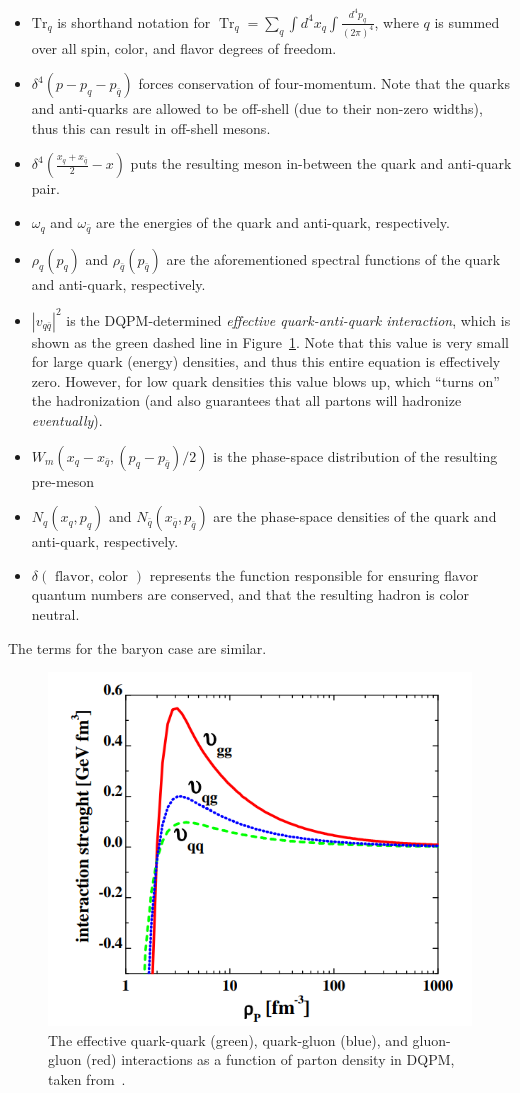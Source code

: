 \begin{itemize}
    \item $\text{Tr}_q$ is shorthand notation for $\operatorname{Tr}_q=\sum_q \int d^4 x_q \int \frac{d^4 p_q}{(2 \pi)^4}$, where $q$ is summed over all spin, color, and flavor degrees of freedom.
    \item $\delta^4(p-p_q-p_{\bar{q}})$ forces conservation of four-momentum. Note that the quarks and anti-quarks are allowed to be off-shell (due to their non-zero widths), thus this can result in off-shell mesons.
    \item $\delta^4\left(\frac{x_q+x_{\bar{q}}}{2}-x\right)$ puts the resulting meson in-between the quark and anti-quark pair.
    \item $\omega_q$ and $\omega_{\bar{q}}$ are the energies of the quark and anti-quark, respectively.
    \item $\rho_q\left(p_q\right)$ and $\rho_{\bar{q}}\left(p_{\bar{q}}\right)$ are the aforementioned spectral functions of the quark and anti-quark, respectively.
    \item $\left|v_{q \bar{q}}\right|^2$ is the DQPM-determined \textit{effective quark-anti-quark interaction}, which is shown as the green dashed line in Figure~\ref{fig:vqq}. Note that this value is very small for large quark (energy) densities, and thus this entire equation is effectively zero. However, for low quark densities this value blows up, which ``turns on'' the hadronization (and also guarantees that all partons will hadronize \textit{eventually}).
    \item $W_m\left(x_q-x_{\bar{q}},\left(p_q-p_{\bar{q}}\right) / 2\right)$ is the phase-space distribution of the resulting pre-meson
    \item $N_q\left(x_q, p_q\right)$ and $N_{\bar{q}}\left(x_{\bar{q}}, p_{\bar{q}}\right)$ are the phase-space densities of the quark and anti-quark, respectively.
    \item $\delta(\text { flavor, color })$ represents the function responsible for ensuring flavor quantum numbers are conserved, and that the resulting hadron is color neutral.
\end{itemize}
The terms for the baryon case are similar.

\begin{figure}[ht]
    \centering
    \includegraphics[width=0.5\linewidth]{figures/introduction/vqq.png}
    \caption{The effective quark-quark (green), quark-gluon (blue), and gluon-gluon (red) interactions as a function of parton density in DQPM, taken from~\cite{PHSD1}.}
    \label{fig:vqq}
\end{figure}

